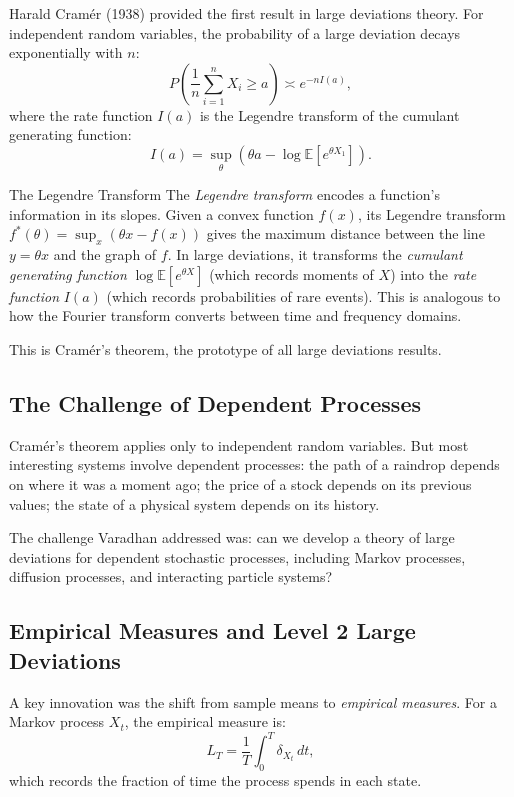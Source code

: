 Harald Cram\'er (1938) provided the first result in large deviations theory. For independent random variables, the probability of a large deviation decays exponentially with $n$:
\[
P\left(\frac{1}{n}\sum_{i=1}^n X_i \geq a\right) \asymp e^{-n I(a)},
\]
where the rate function $I(a)$ is the Legendre transform of the cumulant generating function:
\[
I(a) = \sup_{\theta} (\theta a - \log \mathbb{E}[e^{\theta X_1}]).
\]

\begin{knowledgebridge}{The Legendre Transform}
The \emph{Legendre transform} encodes a function's information in its slopes. Given a convex function $f(x)$, its Legendre transform $f^*(\theta) = \sup_x (\theta x - f(x))$ gives the maximum distance between the line $y = \theta x$ and the graph of $f$. In large deviations, it transforms the \emph{cumulant generating function} $\log \mathbb{E}[e^{\theta X}]$ (which records moments of $X$) into the \emph{rate function} $I(a)$ (which records probabilities of rare events). This is analogous to how the Fourier transform converts between time and frequency domains.
\end{knowledgebridge}

This is Cram\'er's theorem, the prototype of all large deviations results.

\subsection{The Challenge of Dependent Processes}

Cram\'er's theorem applies only to independent random variables. But most interesting systems involve dependent processes: the path of a raindrop depends on where it was a moment ago; the price of a stock depends on its previous values; the state of a physical system depends on its history.

The challenge Varadhan addressed was: can we develop a theory of large deviations for dependent stochastic processes, including Markov processes, diffusion processes, and interacting particle systems?

\subsection{Empirical Measures and Level 2 Large Deviations}

A key innovation was the shift from sample means to \emph{empirical measures}. For a Markov process $X_t$, the empirical measure is:
\[
L_T = \frac{1}{T} \int_0^T \delta_{X_t} \, dt,
\]
which records the fraction of time the process spends in each state.


